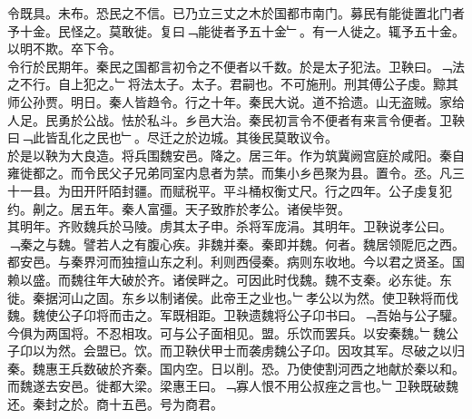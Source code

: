 \documentclass{zhvt-classic}
\begin{document}
\hspace*{2em}令既具。未布。恐民之不信。已乃立三丈之木於国都市南门。募民有能徙置北门者予十金。民怪之。莫敢徙。复曰﹁能徙者予五十金﹂。有一人徙之。辄予五十金。以明不欺。卒下令。\\
\hspace*{2em}令行於民期年。秦民之国都言初令之不便者以千数。於是太子犯法。卫鞅曰。﹁法之不行。自上犯之。﹂将法太子。太子。君嗣也。不可施刑。刑其傅公子虔。黥其师公孙贾。明日。秦人皆趋令。行之十年。秦民大说。道不拾遗。山无盗贼。家给人足。民勇於公战。怯於私斗。乡邑大治。秦民初言令不便者有来言令便者。卫鞅曰﹁此皆乱化之民也﹂。尽迁之於边城。其後民莫敢议令。\\
\hspace*{2em}於是以鞅为大良造。将兵围魏安邑。降之。居三年。作为筑冀阙宫庭於咸阳。秦自雍徙都之。而令民父子兄弟同室内息者为禁。而集小乡邑聚为县。置令。丞。凡三十一县。为田开阡陌封疆。而赋税平。平斗桶权衡丈尺。行之四年。公子虔复犯约。劓之。居五年。秦人富彊。天子致胙於孝公。诸侯毕贺。\\
\hspace*{2em}其明年。齐败魏兵於马陵。虏其太子申。杀将军庞涓。其明年。卫鞅说孝公曰。﹁秦之与魏。譬若人之有腹心疾。非魏并秦。秦即并魏。何者。魏居领阸厄之西。都安邑。与秦界河而独擅山东之利。利则西侵秦。病则东收地。今以君之贤圣。国赖以盛。而魏往年大破於齐。诸侯畔之。可因此时伐魏。魏不支秦。必东徙。东徙。秦据河山之固。东乡以制诸侯。此帝王之业也。﹂孝公以为然。使卫鞅将而伐魏。魏使公子卬将而击之。军既相距。卫鞅遗魏将公子卬书曰。﹁吾始与公子驩。今俱为两国将。不忍相攻。可与公子面相见。盟。乐饮而罢兵。以安秦魏。﹂魏公子卬以为然。会盟已。饮。而卫鞅伏甲士而袭虏魏公子卬。因攻其军。尽破之以归秦。魏惠王兵数破於齐秦。国内空。日以削。恐。乃使使割河西之地献於秦以和。而魏遂去安邑。徙都大梁。梁惠王曰。﹁寡人恨不用公叔痤之言也。﹂卫鞅既破魏还。秦封之於。商十五邑。号为商君。\\
\end{document}
